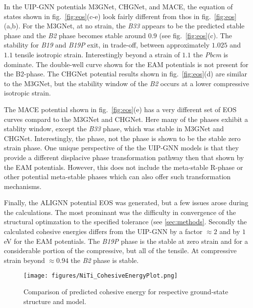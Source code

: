 \documentclass[preprint]{elsarticle}
\begin{document}
In the UIP-GNN potentials M3GNet, CHGNet, and MACE, the equation of states shown in fig.~\ref{fig:eos}(c-e) look fairly different from thos in fig.~\ref{fig:eos}(a,b). For the M3GNet,  at no strain, the \textit{B33} appears to be the predicted stable phase and the \textit{B2} phase becomes stable around $0.9$ (see fig.~\ref{fig:eos}(c). The stability for \textit{B19} and \textit{B19P} exit, in trade-off, between approximately $1.025$ and $1.1$ tensile isotropic strain. Interestingly beyond a strain of $1.1$ the \textit{Pbcm} is dominate. The double-well curve shown for the EAM potentials is not present for the B2-phase. The CHGNet potential results shown in fig.~\ref{fig:eos}(d) are similar to the M3GNet, but the stability window of the \textit{B2} occurs at a lower compressive isotropic strain. \par

The MACE potential shown in fig.~\ref{fig:eos}(e) has a very different set of EOS curves compard to the M3GNet and CHGNet. Here many of the phases exhibit a stablity window, except the \textit{B33} phase, which was stable in M3GNet and CHGNet. Interestingly, the  phase, not the  phase is shown to be the stable zero strain phase. One unique perspective of the the UIP-GNN models is that they provide a different displacive phase transformation pathway then that shown by the EAM potentials. However, this does not include the meta-stable R-phase or other potential meta-stable phases which can also offer such transformation mechanisms. \par


Finally, the ALIGNN potential EOS was generated, but a few issues arose during the calculations. The most prominant was the difficulty in convergence of the structural optimzation to the specified tolerance (see \ref{sec:methods}. Secondly the calculated cohesive energies differs from the UIP-GNN by a factor $\approx 2$ and by $1$ eV for the EAM potentials. The \textit{B19P} phase is the stable at zero strain and for a considerable portion of the compressive, but all of the tensile. At compressive strain beyond $\approx 0.94$ the \textit{B2} phase is stable. 

\begin{figure}[ht!]
    \begin{centering}
        \texttt{[image: figures/NiTi\_CohesiveEnergyPlot.png]}
        \caption{
          Comparison of predicted cohesive energy for respective ground-state structure and model.
        }
        \label{fig:ecoh}
    \end{centering}
\end{figure}
\end{document}
